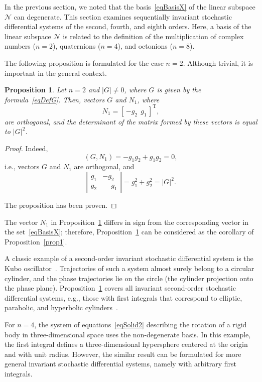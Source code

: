 \documentclass[10pt,reqno]{amsart}
\newcommand{\trans}{{\scriptscriptstyle \mathrm{T}}}
\theoremstyle{plain}
\newtheorem{Proposition}{Proposition}
\theoremstyle{remark}
\begin{document}
In the previous section, we noted that the basis~\eqref{eqBasisX} of the linear subspace $\mathcal{N}$ can degenerate. This section examines sequentially invariant stochastic differential systems of the second, fourth, and eighth orders. Here, a basis of the linear subspace $\mathcal{N}$ is related to the definition of the multiplication of complex numbers ($n = 2$), quaternions ($n = 4$), and octonions ($n = 8$).

The following proposition is formulated for the case $n = 2$. Although trivial, it is important in the general context.

\begin{Proposition}\label{propDim2}
Let $n = 2$ and $|G| \neq 0$, where $G$ is given by the formula~\eqref{eqDefG}. Then, vectors $G$ and $N_1$, where
\begin{equation}\label{eqBasisDim2}
  N_1 = [ \, {-g_2} \ \ g_1 \, ]^\trans,
\end{equation}
are orthogonal, and the determinant of the matrix formed by these vectors is equal to $|G|^2$.
\end{Proposition}

\begin{proof}
Indeed,
\[
  (G,N_1) = -g_1 g_2 + g_1 g_2 = 0,
\]
i.e., vectors $G$ and $N_1$ are orthogonal, and
\[
  \left| \begin{array}{cc}
    g_1 & -g_2 \\
    g_2 & \phantom{-}g_1
  \end{array} \right| = g_1^2 + g_2^2 = |G|^2.
\]

The proposition has been proven.
\end{proof}

The vector $N_1$ in Proposition~\ref{propDim2} differs in sign from the corresponding vector in the set~\eqref{eqBasisX}; therefore, Proposition~\ref{propDim2} can be considered as the corollary of Proposition~\ref{prop1}.

A classic example of a second-order invariant stochastic differential system is the Kubo oscillator~\cite{Kubo_JMP63}. Trajectories of such a system almost surely belong to a circular cylinder, and the phase trajectories lie on the circle (the cylinder projection onto the phase plane). Proposition~\ref{propDim2} covers all invariant second-order stochastic differential systems, e.g., those with first integrals that correspond to elliptic, parabolic, and hyperbolic cylinders~\cite{AveKarRyb_Sibircon17}.

For $n = 4$, the system of equations~\eqref{eqSolid2} describing the rotation of a rigid body in three-dimensional space uses the non-degenerate basis. In this example, the first integral defines a three-dimensional hypersphere centered at the origin and with unit radius. However, the similar result can be formulated for more general invariant stochastic differential systems, namely with arbitrary first integrals.
\end{document}
